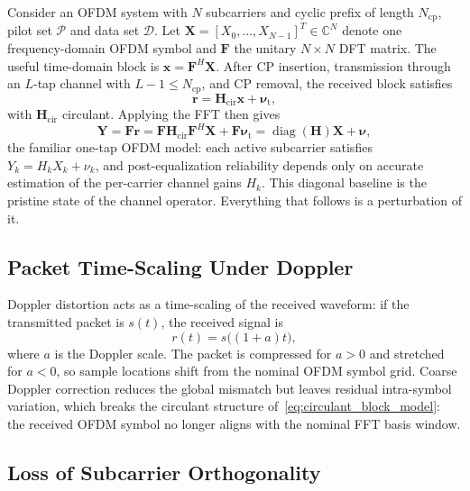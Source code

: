 \documentclass{wileysev}
\newcommand{\C}{\mathbb{C}}
\begin{document}
	Consider an OFDM system with \(N\) subcarriers and cyclic prefix of length \(N_{\mathrm{cp}}\), pilot set \(\mathcal{P}\) and data set \(\mathcal{D}\). Let \(\mathbf{X}=[X_0,\dots,X_{N-1}]^{T}\in\C^N\) denote one frequency-domain OFDM symbol and \(\mathbf{F}\) the unitary \(N\times N\) DFT matrix. The useful time-domain block is \(\mathbf{x}=\mathbf{F}^{H}\mathbf{X}\). After CP insertion, transmission through an \(L\)-tap channel with \(L-1\le N_{\mathrm{cp}}\), and CP removal, the received block satisfies
	\begin{equation}
		\mathbf{r} = \mathbf{H}_{\mathrm{cir}}\mathbf{x} + \bm{\nu}_{\mathrm{t}},
		\label{eq:circulant_block_model}
	\end{equation}
	with \(\mathbf{H}_{\mathrm{cir}}\) circulant. Applying the FFT then gives
	\begin{equation}
		\mathbf{Y}
		=
		\mathbf{F}\mathbf{r}
		=
		\mathbf{F}\mathbf{H}_{\mathrm{cir}}\mathbf{F}^{H}\mathbf{X}
		+
		\mathbf{F}\bm{\nu}_{\mathrm{t}}
		=
		\operatorname{diag}(\mathbf{H})\mathbf{X}
		+
		\bm{\nu},
		\label{eq:nominal_diagonal_ofdm}
	\end{equation}
	the familiar one-tap OFDM model: each active subcarrier satisfies \(Y_k = H_k X_k + \nu_k\), and post-equalization reliability depends only on accurate estimation of the per-carrier channel gains \(H_k\). This diagonal baseline is the pristine state of the channel operator. Everything that follows is a perturbation of it.
	
	\subsection{Packet Time-Scaling Under Doppler}
	\label{ssec:time_scaling}
	
	Doppler distortion acts as a time-scaling of the received waveform: if the transmitted packet is \(s(t)\), the received signal is
	\begin{equation}
		r(t) = s\!\big((1+a)t\big),
		\label{eq:time_scaling_intro}
	\end{equation}
	where \(a\) is the Doppler scale. The packet is compressed for \(a>0\) and stretched for \(a<0\), so sample locations shift from the nominal OFDM symbol grid. Coarse Doppler correction reduces the global mismatch but leaves residual intra-symbol variation, which breaks the circulant structure of~\eqref{eq:circulant_block_model}: the received OFDM symbol no longer aligns with the nominal FFT basis window.
	
	\subsection{Loss of Subcarrier Orthogonality}
	\label{ssec:orthogonality_loss}
	
\end{document}
